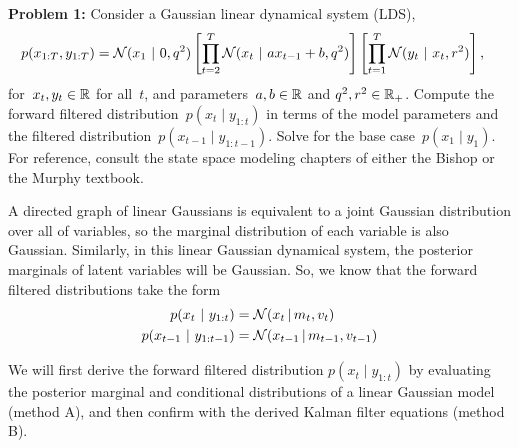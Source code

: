 \textbf{Problem 1:} Consider a Gaussian linear dynamical system (LDS),
\begin{align*}
    p(x_{1:T}, y_{1:T}) &= \mathcal{N}(x_1 ~\vert~ 0, q^2) \left[ \prod_{t=2}^T \mathcal{N}(x_t ~\vert~ a x_{t-1} + b, q^2) \right] 
    \left[ \prod_{t=1}^T \mathcal{N}(y_{t} ~\vert~ x_t, r^2) \right],
\end{align*}
for~$x_t, y_t \in \mathbb{R}$ for all~$t$, and parameters~$a, b \in \mathbb{R}$ and $q^2, r^2 \in \mathbb{R}_+$.  
Compute the forward filtered distribution~$p(x_t \mid y_{1:t})$ in terms of the model parameters 
and the filtered distribution~$p(x_{t-1} \mid y_{1:t-1})$.  Solve for the base case~$p(x_1 \mid y_1)$.  
For reference, consult the state space modeling chapters of either the Bishop or the Murphy textbook.

\begin{solution}

A directed graph of linear Gaussians is equivalent to a joint Gaussian distribution over all of variables,
so the marginal distribution of each variable is also Gaussian.
Similarly, in this linear Gaussian dynamical system, the posterior marginals of latent variables will be Gaussian.
So, we know that the forward filtered distributions take the form
\begin{align*}
	p(x_t ~\vert~ y_{1:t}) &= \mathcal{N}(x_t \,|\, m_t, v_t) \\
	p(x_{t-1} ~\vert~ y_{1:t-1}) &= \mathcal{N}(x_{t-1} \,|\, m_{t-1}, v_{t-1})
\end{align*}

We will first derive the forward filtered distribution $p(x_t \mid y_{1:t})$ by evaluating the posterior marginal and conditional distributions of a linear Gaussian model (method A), and then confirm with the derived Kalman filter equations (method B).


\end{solution}
